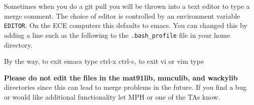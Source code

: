 Sometimes when you do a git pull you will be thrown into a text editor
to type a merge comment. The choice of editor is controlled by an
environment variable \texttt{EDITOR}. On the ECE computers this defaults
to emacs. You can changed this by adding a line such as the following to
the \texttt{.bash\_profile} file in your home directory.

\begin{Shaded}
\begin{Highlighting}[]
 
\end{Highlighting}
\end{Shaded}

By the way, to exit emacs type ctrl-x ctrl-c, to exit vi or vim type 

\textbf{Please do not edit the files in the mat91lib, mmculib, and
wackylib} directories since this can lead to merge problems in the
future. If you find a bug or would like additional functionality let MPH
or one of the TAs know.

